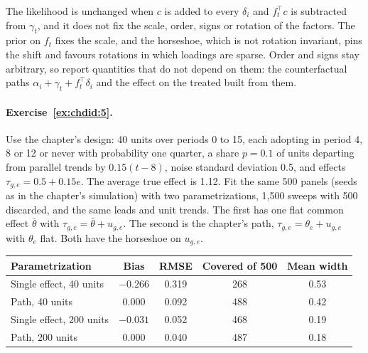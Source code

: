 The likelihood is unchanged when $c$ is added to every $\delta_i$ and $f_t^\top c$ is subtracted from $\gamma_t$, and it does not fix the scale, order, signs or rotation of the factors. The prior on $f_t$ fixes the scale, and the horseshoe, which is not rotation invariant, pins the shift and favours rotations in which loadings are sparse. Order and signs stay arbitrary, so report quantities that do not depend on them: the counterfactual paths $\alpha_i + \gamma_t + f_t^\top\delta_i$ and the effect on the treated built from them.


\paragraph{Exercise~\ref{ex:chdid:5}.} Use the chapter's design: 40 units over periods 0 to 15, each adopting in period 4, 8 or 12 or never with probability one quarter, a share $p = 0.1$ of units departing from parallel trends by $0.15(t - 8)$, noise standard deviation 0.5, and effects $\tau_{g,e} = 0.5 + 0.15e$. The average true effect is 1.12. Fit the same 500 panels (seeds as in the chapter's simulation) with two parametrizations, 1,500 sweeps with 500 discarded, and the same leads and unit trends. The first has one flat common effect $\bar\theta$ with $\tau_{g,e} = \bar\theta + u_{g,e}$. The second is the chapter's path, $\tau_{g,e} = \theta_e + u_{g,e}$ with $\theta_e$ flat. Both have the horseshoe on $u_{g,e}$.
\begin{center}
\small
\begin{tabular}{@{}lcccc@{}}
\toprule
Parametrization & Bias & RMSE & Covered of 500 & Mean width \\
\midrule
Single effect, 40 units & $-0.266$ & 0.319 & 268 & 0.53 \\
Path, 40 units & 0.000 & 0.092 & 488 & 0.42 \\
Single effect, 200 units & $-0.031$ & 0.052 & 468 & 0.19 \\
Path, 200 units & 0.000 & 0.040 & 487 & 0.18 \\
\bottomrule
\end{tabular}
\end{center}
